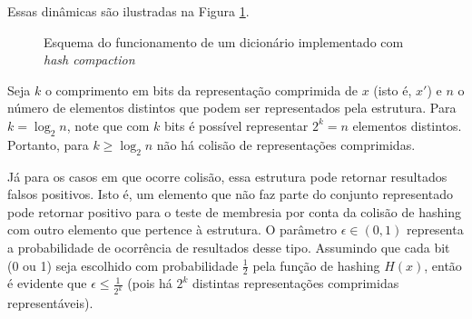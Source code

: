 \documentclass[12pt,twoside,english,brazilian]{book}
\begin{document}
Essas dinâmicas são ilustradas na Figura \ref{hash-compaction}.

\begin{figure}
    \begin{center}
        \caption{\label{hash-compaction} Esquema do funcionamento de um dicionário implementado com \textit{hash compaction}}
    \end{center}
\end{figure}

Seja $k$ o comprimento em bits da representação comprimida de $x$ (isto é, $x'$) e $n$ o número de elementos distintos que podem ser representados pela estrutura. Para $k = \log_2{n}$, note que com $k$ bits é possível representar $2^k = n$ elementos distintos. Portanto, para $k \geq \log_2{n}$ não há colisão de representações comprimidas.

Já para os casos em que ocorre colisão, essa estrutura pode retornar resultados falsos positivos. Isto é, um elemento que não faz parte do conjunto representado pode retornar positivo para o teste de membresia por conta da colisão de hashing com outro elemento que pertence à estrutura. O parâmetro $\epsilon \in (0,1)$ representa a probabilidade de ocorrência de resultados desse tipo. Assumindo que cada bit (0 ou 1) seja escolhido com probabilidade $\frac{1}{2}$ pela função de hashing $H(x)$, então é evidente que $\epsilon \leq \frac{1}{2^k}$ (pois há $2^k$ distintas representações comprimidas representáveis).
\end{document}
